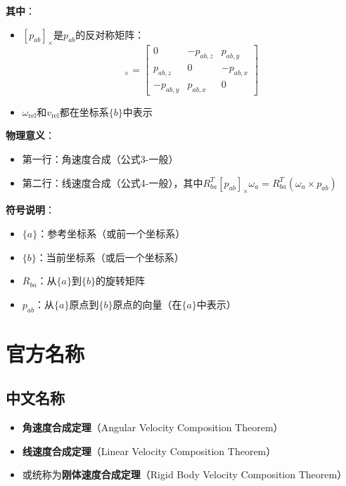 \documentclass[12pt,a4paper]{article}
\begin{document}
\textbf{其中}：
\begin{itemize}
\item $[p_{ab}]_{\times}$是$p_{ab}$的反对称矩阵：
\begin{equation}
[p_{ab}]_{\times} = \begin{bmatrix}
0 & -p_{ab,z} & p_{ab,y} \\
p_{ab,z} & 0 & -p_{ab,x} \\
-p_{ab,y} & p_{ab,x} & 0
\end{bmatrix}
\end{equation}
\item $\omega_{\text{rel}}$和$v_{\text{rel}}$都在坐标系$\{b\}$中表示
\end{itemize}

\textbf{物理意义}：
\begin{itemize}
\item 第一行：角速度合成（公式3-一般）
\item 第二行：线速度合成（公式4-一般），其中$R_{ba}^T [p_{ab}]_{\times} \omega_a = R_{ba}^T (\omega_a \times p_{ab})$
\end{itemize}

\textbf{符号说明}：
\begin{itemize}
\item $\{a\}$：参考坐标系（或前一个坐标系）
\item $\{b\}$：当前坐标系（或后一个坐标系）
\item $R_{ba}$：从$\{a\}$到$\{b\}$的旋转矩阵
\item $p_{ab}$：从$\{a\}$原点到$\{b\}$原点的向量（在$\{a\}$中表示）
\end{itemize}

\section{官方名称}

\subsection{中文名称}

\begin{itemize}
\item \textbf{角速度合成定理}（Angular Velocity Composition Theorem）
\item \textbf{线速度合成定理}（Linear Velocity Composition Theorem）
\item 或统称为\textbf{刚体速度合成定理}（Rigid Body Velocity Composition Theorem）
\end{itemize}
\end{document}
